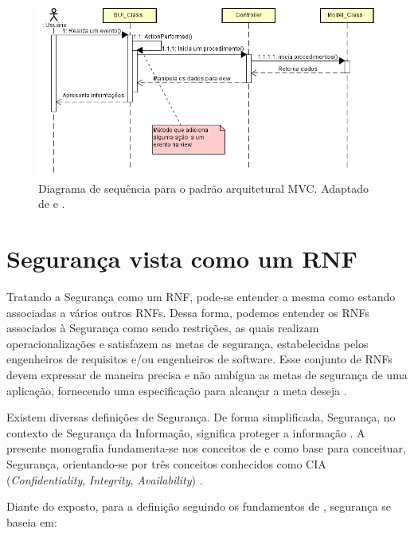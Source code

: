 \begin{figure}[h!]
	\centering
	\includegraphics[keepaspectratio=true,scale=0.8]{figuras/DiagramaDeSequenciaMVC.PNG}
	\caption{Diagrama de sequência para o padrão arquitetural MVC. Adaptado de \cite{durelli2008proposta} e \cite{buschmann1996system}.}
	\label{DiagramaDeSequenciaMVC}
\end{figure}

\pagebreak

\section{Segurança vista como um RNF}
\label{sec:seguranca}

Tratando a Segurança como um RNF, pode-se entender a mesma como estando associadas a vários outros RNFs. Dessa forma, podemos entender os RNFs associados à Segurança como sendo restrições, as quais realizam operacionalizações e satisfazem as metas de segurança, estabelecidas pelos engenheiros de requisitos e/ou engenheiros de software. Esse conjunto de  RNFs devem expressar de maneira precisa e não ambígua as metas de segurança de uma aplicação, fornecendo uma especificação para alcançar a meta deseja \cite{haley2006framework}.  

Existem diversas definições de Segurança. De forma simplificada, Segurança, no contexto de Segurança da Informação, significa proteger a informação \cite{chung2012non}. A presente monografia fundamenta-se nos conceitos de \cite{chung2012non} e \cite{sullivan2011web} como base para conceituar, Segurança, orientando-se por três conceitos conhecidos como CIA (\textit{Confidentiality}, \textit{Integrity}, \textit{Availability}) . 

Diante do exposto, para a definição seguindo os fundamentos de \cite{chung2012non}, segurança se baseia em: 

